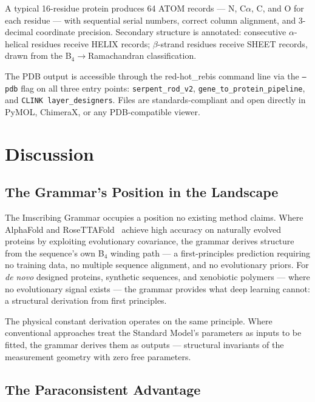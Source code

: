 \documentclass[11pt,a4paper,twocolumn]{article}
\begin{document}
A typical 16-residue protein produces 64 ATOM records — N, C$\alpha$, C, and O for each residue — with sequential serial numbers, correct column alignment, and 3-decimal coordinate precision. Secondary structure is annotated: consecutive $\alpha$-helical residues receive HELIX records; $\beta$-strand residues receive SHEET records, drawn from the B$_4$$\to$Ramachandran classification.

The PDB output is accessible through the red-hot\_rebis command line via the \texttt{--pdb} flag on all three entry points: \texttt{serpent\_rod\_v2}, \texttt{gene\_to\_protein\_pipeline}, and \texttt{CLINK layer\_designers}. Files are standards-compliant and open directly in PyMOL, ChimeraX, or any PDB-compatible viewer.


\section{Discussion}

\subsection{The Grammar's Position in the Landscape}

The Imscribing Grammar occupies a position no existing method claims. Where AlphaFold and RoseTTAFold~\cite{jumper2021alphafold,baek2021rosettafold} achieve high accuracy on naturally evolved proteins by exploiting evolutionary covariance, the grammar derives structure from the sequence's own B$_4$ winding path — a first-principles prediction requiring no training data, no multiple sequence alignment, and no evolutionary priors. For \emph{de novo} designed proteins, synthetic sequences, and xenobiotic polymers — where no evolutionary signal exists — the grammar provides what deep learning cannot: a structural derivation from first principles.

The physical constant derivation operates on the same principle. Where conventional approaches treat the Standard Model's parameters as inputs to be fitted, the grammar derives them as outputs — structural invariants of the measurement geometry with zero free parameters.

\subsection{The Paraconsistent Advantage}
\end{document}

